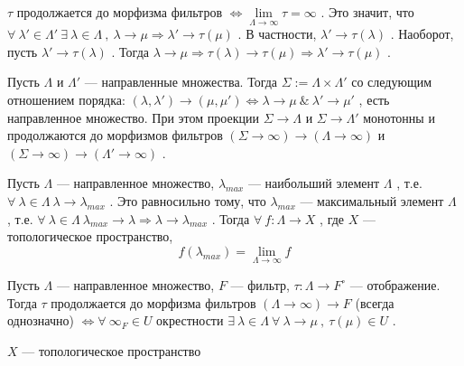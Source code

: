 \SSproof

\( \tau \) продолжается до морфизма фильтров \( \Leftrightarrow \lim\limits_{\Lambda \rightarrow \infty} \tau = \infty \) . Это значит, что \( \forall~\lambda' \in \Lambda' ~\exists~\lambda \in \Lambda ~,~ \lambda \rightarrow \mu \Rightarrow \lambda' \rightarrow \tau(\mu) \) . В частности, \( \lambda' \rightarrow \tau(\lambda) \) . Наоборот, пусть \( \lambda' \rightarrow \tau(\lambda) \) . Тогда \( \lambda \rightarrow \mu \Rightarrow \tau(\lambda) \rightarrow \tau(\mu) \Rightarrow \lambda' \rightarrow \tau(\mu) \) .

\SSendp

\SSsect Пусть \( \Lambda \) и \( \Lambda' \) --- направленные множества. Тогда \( \Sigma := \Lambda \times \Lambda' \) со следующим отношением порядка: \( (\lambda,\lambda') \rightarrow (\mu,\mu') \Leftrightarrow \lambda \rightarrow \mu ~\&~  \lambda' \rightarrow \mu' \) , есть направленное множество. При этом проекции \( \Sigma \rightarrow \Lambda \) и \( \Sigma \rightarrow \Lambda' \) монотонны и продолжаются до морфизмов фильтров \( (\Sigma \rightarrow \infty) \rightarrow (\Lambda \rightarrow \infty) \) и \( (\Sigma \rightarrow \infty) \rightarrow (\Lambda' \rightarrow \infty) \) .

\SSsect Пусть \( \Lambda \) --- направленное множество, \( \lambda_{max} \) --- наибольший элемент \( \Lambda \) , т.е. \( \forall~\lambda \in \Lambda~ \lambda \rightarrow \lambda_{max} \) . Это равносильно тому, что \( \lambda_{max} \) --- максимальный элемент \( \Lambda \) , т.е. \( \forall~\lambda \in \Lambda~ \lambda_{max} \rightarrow \lambda \Rightarrow \lambda \rightarrow \lambda_{max} \) .
Тогда \( \forall~ f:\Lambda \rightarrow X \) , где \( X \) --- топологическое пространство,
\[ f(\lambda_{max}) = \lim\limits_{\Lambda \rightarrow \infty} f \]

\SSsect Пусть \( \Lambda \) --- направленное множество, \( F \) --- фильтр, \( \tau:\Lambda \rightarrow F^{\circ} \) --- отображение. Тогда \( \tau \) продолжается до морфизма фильтров \( (\Lambda \rightarrow \infty) \rightarrow F \) (всегда однозначно) \( \Leftrightarrow \forall~ \infty_F \in U \) окрестности \( \exists~\lambda \in \Lambda ~\forall~\lambda \rightarrow \mu ~,~ \tau(\mu) \in U \) .

\pagebreak

\SSbullet 
\begin{center}
    \( X \) --- топологическое пространство
\end{center}

